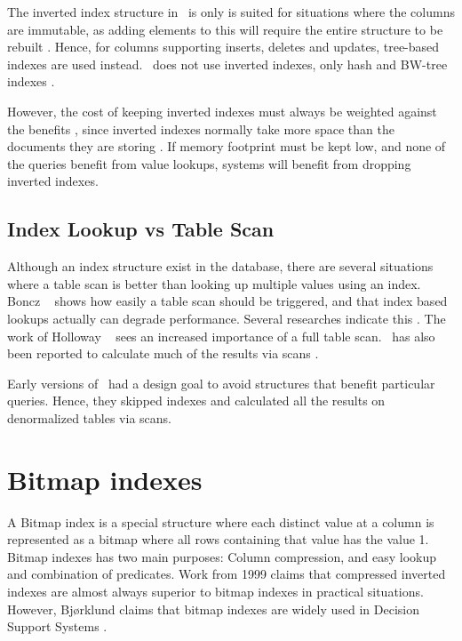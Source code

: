The inverted index structure in \hyrise~is only is suited for situations where the columns are immutable, as adding elements to this will require the entire structure to be rebuilt \cite{Schwalb2014-hn}. Hence, for columns supporting inserts, deletes and updates, tree-based indexes are used instead. \mssql~does not use inverted indexes, only hash and BW-tree indexes \cite{Delaney2014-ip, noauthor_undated-vq}.

However, the cost of keeping inverted indexes must always be weighted against the benefits \cite{Lemke2010-is}, since inverted indexes normally take more space than the documents they are storing \cite{Moffat1992-tz}. If memory footprint must be kept low, and none of the queries benefit from value lookups, systems will benefit from dropping inverted indexes.

\subsection{Index Lookup vs Table Scan}
\label{sub:Index Lookup vs Table Scan}
Although an index structure exist in the database, there are several situations where a table scan is better than looking up multiple values using an index. Boncz \ea~\cite{Boncz2006-md} shows how easily a table scan should be triggered, and that index based lookups actually can degrade performance. Several researches indicate this \cite{Boncz2002-yj, Abadi2008-dd}. The work of Holloway \ea~\cite{Holloway2008-rr} sees an increased importance of a full table scan. \qlikview~has also been reported to calculate much of the results via scans \cite{noauthor_undated-js}. 

Early versions of \blink~had a design goal to avoid structures that benefit particular queries. Hence, they skipped indexes and calculated all the results on denormalized tables via scans.

\section{Bitmap indexes}
\label{sec:Bitmap indexes}
A Bitmap index is a special structure where each distinct value at a column is represented as a bitmap where all rows containing that value has the value 1. Bitmap indexes has two main purposes: Column compression, and easy lookup and combination of predicates. Work from 1999 \cite{Witten1999-qq} claims that compressed inverted indexes are almost always superior to bitmap indexes in practical situations. However, Bjørklund claims that bitmap indexes are widely used in Decision Support Systems \cite{Bjorklund2011-wh}. 

